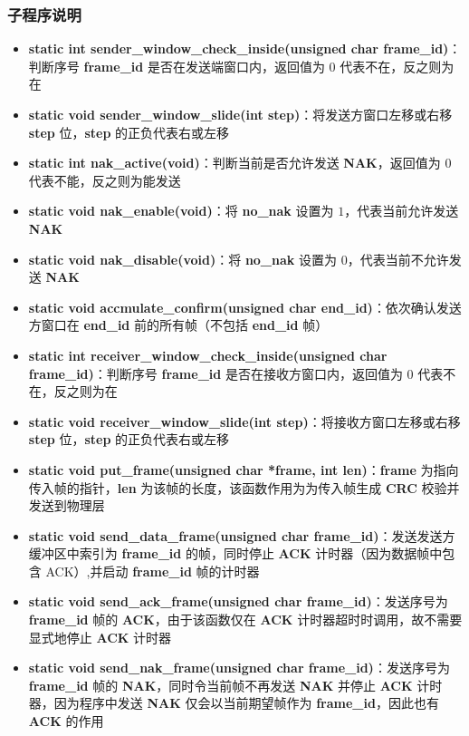        \subsubsection{子程序说明}
            \begin{itemize}
                \item \textbf{static int sender\_window\_check\_inside(unsigned char frame\_id)}：判断序号 \textbf{frame\_id} 是否在发送端窗口内，返回值为 $0$ 代表不在，反之则为在
                \item \textbf{static void sender\_window\_slide(int step)}：将发送方窗口左移或右移 \textbf{step} 位，\textbf{step} 的正负代表右或左移
                \item \textbf{static int nak\_active(void)}：判断当前是否允许发送 \textbf{NAK}，返回值为 $0$ 代表不能，反之则为能发送
                \item \textbf{static void nak\_enable(void)}：将 \textbf{no\_nak} 设置为 $1$，代表当前允许发送 \textbf{NAK}
                \item \textbf{static void nak\_disable(void)}：将 \textbf{no\_nak} 设置为 $0$，代表当前不允许发送 \textbf{NAK}
                \item \textbf{static void accmulate\_confirm(unsigned char end\_id)}：依次确认发送方窗口在 \textbf{end\_id} 前的所有帧（不包括 \textbf{end\_id} 帧）
                \item \textbf{static int receiver\_window\_check\_inside(unsigned char frame\_id)}：判断序号 \textbf{frame\_id} 是否在接收方窗口内，返回值为 $0$ 代表不在，反之则为在
                \item \textbf{static void receiver\_window\_slide(int step)}：将接收方窗口左移或右移 \textbf{step} 位，\textbf{step} 的正负代表右或左移
                \item \textbf{static void put\_frame(unsigned char *frame, int len)}：\textbf{frame} 为指向传入帧的指针，\textbf{len} 为该帧的长度，该函数作用为为传入帧生成 \textbf{CRC} 校验并发送到物理层
                \item \textbf{static void send\_data\_frame(unsigned char frame\_id)}：发送发送方缓冲区中索引为 \textbf{frame\_id} 的帧，同时停止 \textbf{ACK} 计时器（因为数据帧中包含 ACK）,并启动 \textbf{frame\_id} 帧的计时器
                \item \textbf{static void send\_ack\_frame(unsigned char frame\_id)}：发送序号为 \textbf{frame\_id} 帧的 \textbf{ACK}，由于该函数仅在 \textbf{ACK} 计时器超时时调用，故不需要显式地停止 \textbf{ACK} 计时器
                \item \textbf{static void send\_nak\_frame(unsigned char frame\_id)}：发送序号为 \textbf{frame\_id} 帧的 \textbf{NAK}，同时令当前帧不再发送 \textbf{NAK} 并停止 \textbf{ACK} 计时器，因为程序中发送 \textbf{NAK} 仅会以当前期望帧作为 \textbf{frame\_id}，因此也有 \textbf{ACK} 的作用
            \end{itemize}

